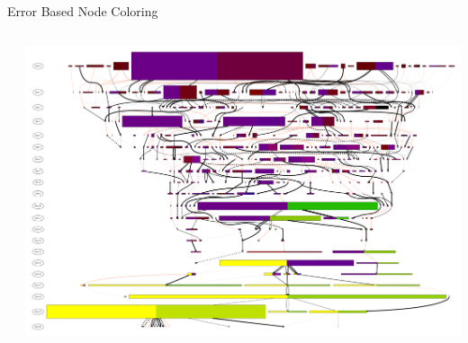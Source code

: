 \documentclass{beamer}
\begin{document}
\begin{frame}{Error Based Node Coloring}
\begin{columns}
\begin{column}{.4\textwidth}
\end{column}
\begin{column}{.6\textwidth}
\includegraphics[width=\textwidth]{Illustrations/run0_bi_color_shaded_percent0.pdf}
\end{column}
\end{columns}
\end{frame}
\end{document}
